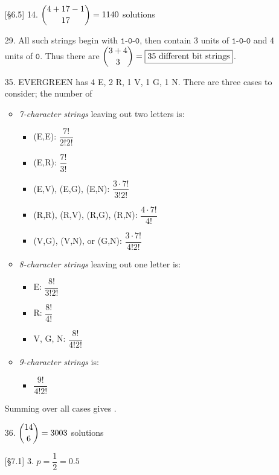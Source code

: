 \documentclass{article}
\begin{document}

\begin{enumerate}
    \item[{[\S 6.5]} 14.] $\dbinom{4+17-1}{17} = 1140$ solutions
    \item[29.] All such strings begin with $\texttt{1-0-0}$, then contain 3 units of $\texttt{1-0-0}$ and 4 units of $\texttt{0}$. Thus there are $\dbinom{3+4}{3} = \fbox{35 different bit strings}$.
    \item[35.] EVERGREEN has 4 E, 2 R, 1 V, 1 G, 1 N. There are three cases to consider; the number of
        \begin{itemize}
            \item \textit{7-character strings} leaving out two letters is:
                \begin{itemize}
                    \item (E,E): $\dfrac{7!}{2!2!}$
                    \item (E,R): $\dfrac{7!}{3!}$
                    \item (E,V), (E,G), (E,N): $\dfrac{3 \cdot 7!}{3!2!}$
                    \item (R,R), (R,V), (R,G), (R,N): $\dfrac{4 \cdot 7!}{4!}$
                    \item (V,G), (V,N), or (G,N): $\dfrac{3 \cdot 7!}{4!2!}$
                \end{itemize}
            \item \textit{8-character strings} leaving out one letter is:
                \begin{itemize}
                    \item E: $\dfrac{8!}{3!2!}$
                    \item R: $\dfrac{8!}{4!}$
                    \item V, G, N: $\dfrac{8!}{4!2!}$
                \end{itemize}
            \item \textit{9-character strings} is:
                \begin{itemize}
                    \item $\dfrac{9!}{4!2!}$
                \end{itemize}
        \end{itemize}
    Summing over all cases gives .
    \item[36.] $\dbinom{14}{6} = 3003$ solutions
    \item[{[\S 7.1]} 3.] $p = \dfrac{1}{2} = 0.5$

\end{enumerate}
\end{document}
